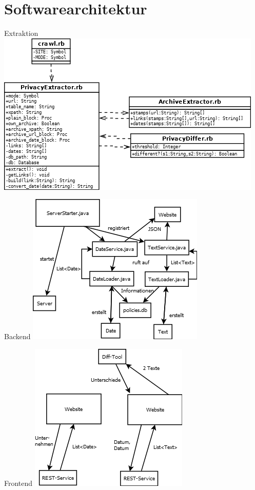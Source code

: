\documentclass[halfparskip]{beamer}
\begin{document}
\section{Softwarearchitektur}
\begin{frame}{Extraktion}
	\centering
	\includegraphics[scale=0.5]{extraction.png}
\end{frame}
\begin{frame}{Backend}
	\centering
	\includegraphics[scale=0.75]{backend.png}
\end{frame}
\begin{frame}{Frontend}
	\centering
	\includegraphics[scale=0.75]{frontend.png}
\end{frame}
\end{document}
